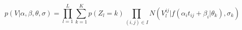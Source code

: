 \documentclass[10pt,xcolor=table]{beamer}
\begin{document}
\begin{frame}
\begin{columns}[T]
\begin{column}{.4\textwidth}
\begin{figure}
  \end{figure}

    \end{column}
  \end{columns}
 
  
  \begin{equation}
\label{eq:dps_vwdpm6}
 p(V|\alpha, \beta, \theta, \sigma) = \prod_{l=1}^L \sum_{k=1}^K p(Z_l = k) \prod_{(i,j) \in I} N(V_l^{ij} | f(\alpha_i t_{ij} + \beta_i | \theta_k), \sigma_k)
\end{equation}

\vspace{-2em}

\end{frame}
\end{document}
